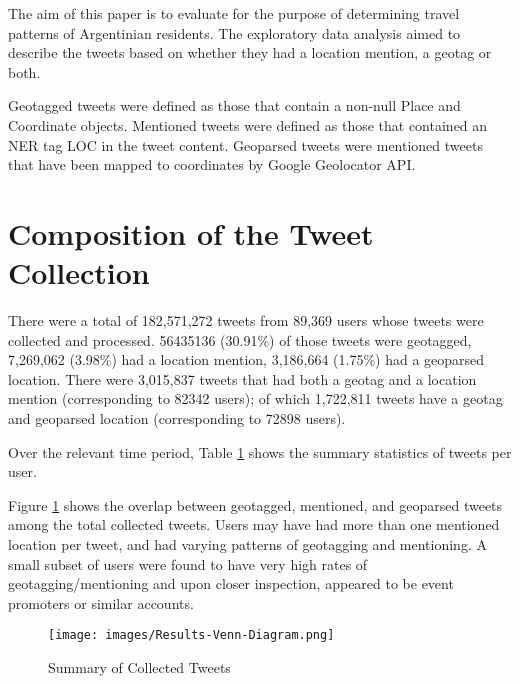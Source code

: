 The aim of this paper is to evaluate for the purpose of determining travel patterns of Argentinian residents.
The exploratory data analysis aimed to describe the tweets based on whether they had a location mention, a geotag or both.


Geotagged tweets were defined as those that contain a non-null Place and Coordinate objects. Mentioned tweets were defined as those that contained an NER tag {\selectfont LOC} in the tweet content. Geoparsed tweets were mentioned tweets that have been mapped to coordinates by Google Geolocator API.

\section{Composition of the Tweet Collection}

There were a total of 182,571,272 tweets from 89,369 users whose tweets were collected and processed.
56435136 (30.91\%)  of those tweets were geotagged,  7,269,062 (3.98\%) had a location mention,  3,186,664 (1.75\%) had a geoparsed location. There were 3,015,837  tweets that had both a geotag and a location mention (corresponding to 82342  users); of which  1,722,811  tweets have a geotag and geoparsed location (corresponding to 72898  users). 

Over the relevant time period, Table \ref{fig:results-venn-diagram} shows the summary statistics of tweets per user.

Figure \ref{fig:results-venn-diagram} shows the overlap between geotagged, mentioned, and geoparsed tweets among the total collected tweets.
Users may have had more than one mentioned location per tweet, and had varying patterns of geotagging and mentioning.
A small subset of users were found to have very high rates of geotagging/mentioning and upon closer inspection, appeared to be event promoters or similar accounts.

\begin{figure}[H]
    \centering
    \texttt{[image: images/Results-Venn-Diagram.png]}
    
    \caption{Summary of Collected Tweets}
    \label{fig:results-venn-diagram}
\end{figure}

